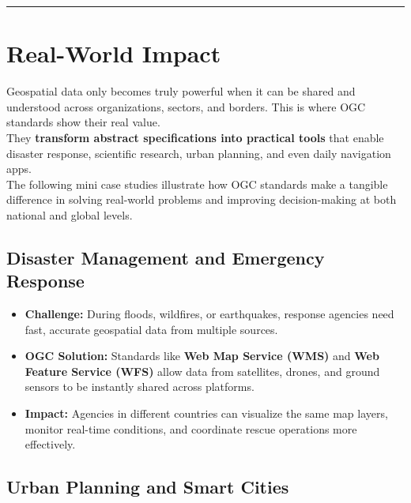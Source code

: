\documentclass[
  11pt,
  letterpaper,
]{book}
\providecommand{\tightlist}{%
  \setlength{\itemsep}{0pt}\setlength{\parskip}{0pt}}
\begin{document}
\begin{center}\rule{0.5\linewidth}{0.5pt}\end{center}

\section{Real-World Impact}\label{real-world-impact}

Geospatial data only becomes truly powerful when it can be shared and
understood across organizations, sectors, and borders. This is where OGC
standards show their real value.\\
They \textbf{transform abstract specifications into practical tools}
that enable disaster response, scientific research, urban planning, and
even daily navigation apps.\\
The following mini case studies illustrate how OGC standards make a
tangible difference in solving real-world problems and improving
decision-making at both national and global levels.

\subsection{Disaster Management and Emergency
Response}\label{disaster-management-and-emergency-response}

\begin{itemize}
\tightlist
\item
  \textbf{Challenge:} During floods, wildfires, or earthquakes, response
  agencies need fast, accurate geospatial data from multiple sources.\\
\item
  \textbf{OGC Solution:} Standards like \textbf{Web Map Service (WMS)}
  and \textbf{Web Feature Service (WFS)} allow data from satellites,
  drones, and ground sensors to be instantly shared across platforms.\\
\item
  \textbf{Impact:} Agencies in different countries can visualize the
  same map layers, monitor real-time conditions, and coordinate rescue
  operations more effectively.
\end{itemize}

\subsection{Urban Planning and Smart
Cities}\label{urban-planning-and-smart-cities}
\end{document}
